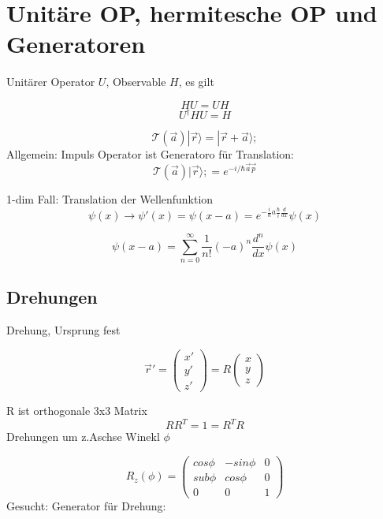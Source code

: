 




\tableofcontents
\setcounter{chapter}{1}
\chapter{Unitäre OP, hermitesche OP und Generatoren}


Unitärer Operator \(U\), Observable \(H\), es gilt

\[
HU=UH
\]
\[
U^\dagger HU=H
\]





\[
\mathcal T(\vec a)|\vec r \rangle  = | \vec r + \vec a \rangle ;
\]
Allgemein: Impuls Operator ist Generatoro für Translation:
\[
\mathcal T(\vec a)|\vec r\rangle ; = e^{-i/\hbar \vec a \vec p}
\]


1-dim Fall: Translation der Wellenfunktion
\[
\psi(x) \rightarrow \psi'(x)=\psi(x-a)=e^{-\frac i \hbar a \frac \hbar i \frac d {dx}}\psi(x)
\]

\[
\psi(x-a)=\sum^\infty_{n=0}\frac 1 {n!}(-a)^n\frac {d^n}{dx}\psi(x)
\]



\section{Drehungen}

Drehung, Ursprung fest

\[
\vec r' =  \left( \begin{array}{c}  x' \\ y' \\ z' \end{array} \right) = R \left( \begin{array}{c}  x \\ y \\ z \end{array} \right)
\]

R ist orthogonale 3x3 Matrix
\[
RR^T=1= R^TR
\]
Drehungen um z.Aschse Winekl \(\phi\)

\[
R_z(\phi)=\left( 
\begin{array}{ccc}
cos\phi &  -sin\phi & 0 \\
sub\phi & cos\phi & 0 \\
0 & 0 & 1
\end{array}
\right)
\]
Gesucht: Generator für Drehung:  


